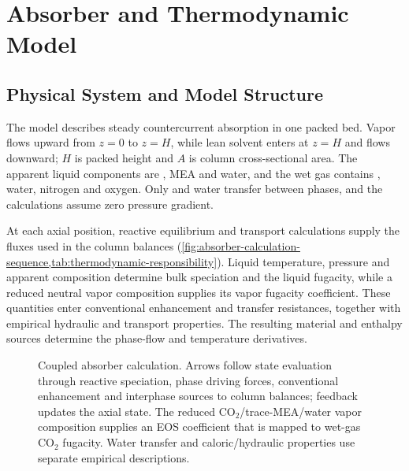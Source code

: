 \section{Absorber and Thermodynamic Model}\label{sec:model-framework}
\subsection{Physical System and Model Structure}
The model describes steady countercurrent absorption in one packed bed.
Vapor flows upward from $z=0$ to $z=H$, while lean solvent enters at $z=H$ and flows downward; $H$ is packed height and $A$ is column cross-sectional area.
The apparent liquid components are \COtwo, MEA and water, and the wet gas contains \COtwo, water, nitrogen and oxygen.
Only \COtwo{} and water transfer between phases, and the calculations assume zero pressure gradient.

At each axial position, reactive equilibrium and transport calculations supply the fluxes used in the column balances (\cref{fig:absorber-calculation-sequence,tab:thermodynamic-responsibility}).
Liquid temperature, pressure and apparent composition determine bulk speciation and the liquid \COtwo{} fugacity, while a reduced neutral vapor composition supplies its vapor fugacity coefficient.
These quantities enter conventional enhancement and transfer resistances, together with empirical hydraulic and transport properties.
The resulting material and enthalpy sources determine the phase-flow and temperature derivatives.

\begin{figure}[pos=htbp]
\centering

\caption{Coupled absorber calculation. Arrows follow state evaluation through reactive speciation, phase driving forces, conventional enhancement and interphase sources to column balances; feedback updates the axial state. The reduced CO$_2$/trace-MEA/water vapor composition supplies an EOS coefficient that is mapped to wet-gas CO$_2$ fugacity. Water transfer and caloric/hydraulic properties use separate empirical descriptions.}
\label{fig:absorber-calculation-sequence}
\end{figure}

